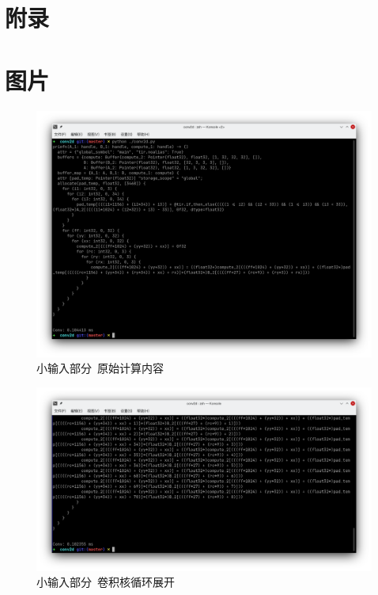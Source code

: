 \section*{附录}
\section{图片}

\begin{figure}[H]
    \includegraphics[width=\textwidth]{images/orig-1.png}
    \caption{小输入部分~原始计算内容}\label{1-1}
\end{figure}

\begin{figure}[H]
    \includegraphics[width=\textwidth]{images/orig-2.png}
    \caption{小输入部分~卷积核循环展开}\label{1-2}
\end{figure}

